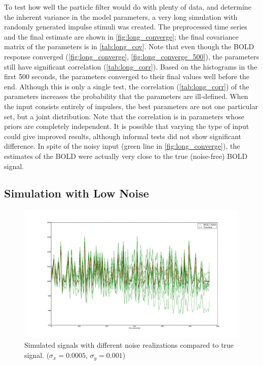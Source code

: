 To test how well the particle filter would do with plenty of data, and
determine the inherent variance in the model parameters, a very long simulation
with randomly generated impulse stimuli was created. The preprocessed time series
and the final estimate are shown in \autoref{fig:long_converge};
the final covariance matrix of the parameters is in \autoref{tab:long_cov}.
Note that even though the \ac{BOLD} response converged (\autoref{fig:long_converge},
\autoref{fig:long_converge_500}),
the parameters still have significant correlation (\autoref{tab:long_corr}).
Based on the histograms in the first 500 seconds, the parameters converged to
their final values well before the end.
Although this is only a single test, the correlation (\autoref{tab:long_corr})
of the parameters increases the probability that the parameters are
ill-defined. When the input
consists entirely of impulses, the best parameters are not one particular
set, but a joint distribution. Note that the correlation is in parameters whose priors
are completely independent. It is possible that varying the type of input could
give improved results, although informal tests did not show significant difference.
In spite of the noisy input (green line in \autoref{fig:long_converge}), the estimates
of the \ac{BOLD} were actually very close to the true (noise-free) \ac{BOLD} signal.

\subsection{Simulation with Low Noise}
\label{sec:SimLowNoise}
\begin{figure}
\centering
\includegraphics[clip=true,trim=6cm 2cm 5cm 3.5cm,width=15cm]{images/realization_lownoise}
\caption[Simulated signals with different noise realizations compared to true
signal.] {Simulated signals with different noise realizations compared to true
signal. ($\sigma_x = 0.0005$, $\sigma_y = 0.001$)}
\label{fig:LowNoiseRealization}
\end{figure}

